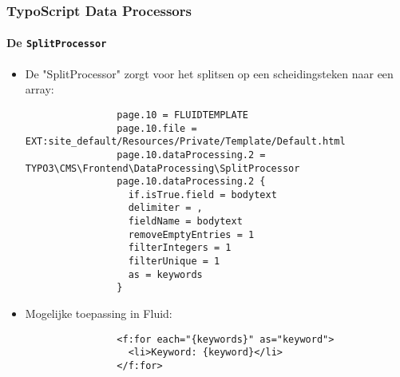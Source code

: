 \begin{frame}[fragile]
	\frametitle{TypoScript Data Processors}
	\framesubtitle{De \texttt{SplitProcessor}}

	\lstset{basicstyle=\tiny\ttfamily}

	\begin{itemize}

		\item De "SplitProcessor" zorgt voor het splitsen op een scheidingsteken naar een array:

			\begin{lstlisting}
				page.10 = FLUIDTEMPLATE
				page.10.file = EXT:site_default/Resources/Private/Template/Default.html
				page.10.dataProcessing.2 = TYPO3\CMS\Frontend\DataProcessing\SplitProcessor
				page.10.dataProcessing.2 {
				  if.isTrue.field = bodytext
				  delimiter = ,
				  fieldName = bodytext
				  removeEmptyEntries = 1
				  filterIntegers = 1
				  filterUnique = 1
				  as = keywords
				}
			\end{lstlisting}

		\item Mogelijke toepassing in Fluid:

			\begin{lstlisting}
				<f:for each="{keywords}" as="keyword">
				  <li>Keyword: {keyword}</li>
				</f:for>
			\end{lstlisting}

	\end{itemize}

\end{frame}



